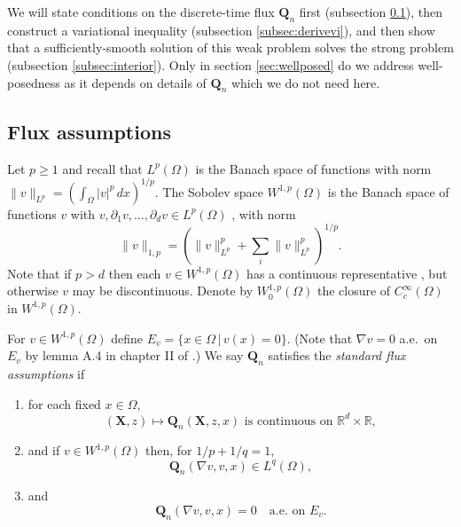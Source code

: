 \documentclass[final,leqno,onefignum,onetabnum]{siamltex1213bueler}
\newcommand\bQ{\mathbf{Q}}
\newcommand\bX{\mathbf{X}}
\renewcommand{\grad}{\nabla}
\newcommand\RR{\mathbb{R}}
\begin{document}
We will state conditions on the discrete-time flux $\bQ_n$ first (subsection \ref{subsec:fluxassumptions}), then construct a variational inequality (subsection \ref{subsec:derivevi}), and then show that a sufficiently-smooth solution of this weak problem solves the strong problem (subsection \ref{subsec:interior}).  Only in section \ref{sec:wellposed} do we address well-posedness as it depends on details of $\bQ_n$ which we do not need here.

\subsection{Flux assumptions} \label{subsec:fluxassumptions}  Let $p\ge 1$ and recall that $L^p (\Omega)$ is the Banach space of functions with norm $\|v\|_{L^p} = \left(\int_\Omega |v|^p\,dx\right)^{1/p}$.  The Sobolev space $W^{1,p}(\Omega)$ is the Banach space of functions $v$ with $v,\partial_1 v,\dots,\partial_d v \in L^p(\Omega)$ \cite{Evans1998}, with norm
\begin{equation}
  \|v\|_{1,p} = \left(\|v\|_{L^p}^p + \sum_i \|v\|_{L^p}^p\right)^{1/p}.  \label{eq:norm}
\end{equation}
Note that if $p>d$ then each $v\in W^{1,p}(\Omega)$ has a continuous representative \cite[``Morrey's inequality'']{Evans1998}, but otherwise $v$ may be discontinuous.  Denote by $W_0^{1,p}(\Omega)$ the closure of $C_c^\infty(\Omega)$ in $W^{1,p}(\Omega)$.

\medskip
\begin{definition}  \label{ass:std}  For $v \in W^{1,p}(\Omega)$ define $E_v = \{x\in\Omega \,\big|\, v(x) = 0\}$.  (Note that $\grad v = 0$ a.e.~on $E_v$ by lemma A.4 in chapter II of \cite{KinderlehrerStampacchia1980}.)  We say $\bQ_n$ satisfies the \emph{standard flux assumptions} if
\renewcommand{\labelenumi}{\emph{\roman{enumi}})}
\begin{enumerate}
\item for each fixed $x\in \Omega$,
\begin{equation}
(\bX,z) \mapsto \bQ_n(\bX,z,x) \text{ is continuous on } \RR^d \times \RR,  \label{eq:Qiscontinuous}
\end{equation}
\item and if $v \in W^{1,p}(\Omega)$ then, for $1/p + 1/q = 1$,
\begin{equation}
\bQ_n(\grad v,v,x) \in L^q(\Omega), \label{eq:QisLq}
\end{equation}
\item and
\begin{equation}
\bQ_n(\grad v,v,x)=0 \quad \text{a.e.~on } E_v. \label{eq:Qiszero}
\end{equation}
\end{enumerate}
\end{definition}
\end{document}
